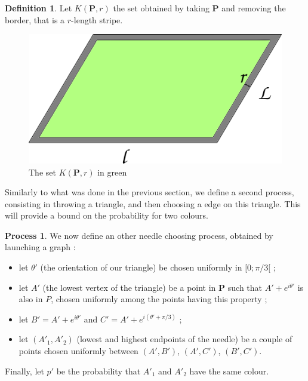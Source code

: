 \documentclass[a4paper,11pt]{article}
\theoremstyle{definition}
\newtheorem{definition}{Definition}
\newtheorem{process}{Process}
\theoremstyle{remark}
\begin{document}
\begin{definition}
Let $K(\mathbf{P},r)$ the set obtained by taking $\mathbf{P}$ 
and removing the border, that is a $r$-length stripe.
\end{definition}

\begin{figure}[h]
\center
\includegraphics[scale=0.5]{tablefinie.png}
\caption{\label{tablefinie} The set $K(\mathbf{P},r)$ in green}
\end{figure}

Similarly to what was done in the previous section, we define a second process, 
consisting in throwing a triangle, and then choosing a edge on this triangle.
This will provide a bound on the probability for two colours.

\begin{process}
We now define an other needle choosing process, obtained by launching a graph :
\begin{itemize}
  \item let $\theta '$ (the orientation of our triangle) be chosen uniformly 
  in $[0;\pi / 3[$ ;
  \item let $A'$ (the lowest vertex of the triangle) be a point in $\mathbf{P}$ such 
  that $A' + e^{i\theta '}$ is also in $P$, chosen uniformly among the points 
  having this property ;
  \item let $B' = A' + e^{i \theta '}$ and $C' = A' + e^{i (\theta ' + \pi / 3 ) }$ ;
  \item let $(A'_1,A'_2)$ (lowest and highest endpoints of the needle) be a 
  couple of points chosen uniformly between $(A',B')$, $(A',C')$, $(B',C')$.
\end{itemize}
Finally, let $p'$ be the probability that $A'_1$ and $A'_2$ have the same 
colour.
\end{process}
\end{document}
